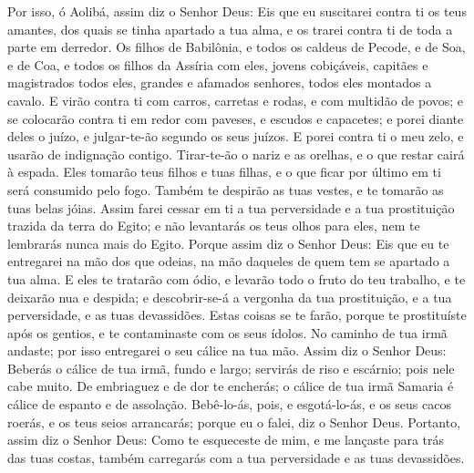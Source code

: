 Por isso, ó Aolibá, assim diz o Senhor Deus: Eis que eu
suscitarei contra ti os teus amantes, dos quais se tinha apartado a
tua alma, e os trarei contra ti de toda a parte em derredor.
Os filhos de Babilônia, e todos os caldeus de Pecode, e de
Soa, e de Coa, e todos os filhos da Assíria com eles, jovens
cobiçáveis, capitães e magistrados todos eles, grandes e afamados
senhores, todos eles montados a cavalo. E virão contra ti com
carros, carretas e rodas, e com multidão de povos; e se colocarão
contra ti em redor com paveses, e escudos e capacetes; e porei
diante deles o juízo, e julgar-te-ão segundo os seus juízos.
E porei contra ti o meu zelo, e usarão de indignação contigo.
Tirar-te-ão o nariz e as orelhas, e o que restar cairá à espada.
Eles tomarão teus filhos e tuas filhas, e o que ficar por último em
ti será consumido pelo fogo. Também te despirão as tuas
vestes, e te tomarão as tuas belas jóias. Assim farei cessar
em ti a tua perversidade e a tua prostituição trazida da terra do
Egito; e não levantarás os teus olhos para eles, nem te lembrarás
nunca mais do Egito. Porque assim diz o Senhor Deus: Eis que
eu te entregarei na mão dos que odeias, na mão daqueles de quem tem
se apartado a tua alma. E eles te tratarão com ódio, e
levarão todo o fruto do teu trabalho, e te deixarão nua e despida; e
descobrir-se-á a vergonha da tua prostituição, e a tua perversidade,
e as tuas devassidões. Estas coisas se te farão, porque te
prostituíste após os gentios, e te contaminaste com os seus ídolos.
No caminho de tua irmã andaste; por isso entregarei o seu
cálice na tua mão. Assim diz o Senhor Deus: Beberás o cálice
de tua irmã, fundo e largo; servirás de riso e escárnio; pois nele
cabe muito. De embriaguez e de dor te encherás; o cálice de
tua irmã Samaria é cálice de espanto e de assolação.
Bebê-lo-ás, pois, e esgotá-lo-ás, e os seus cacos roerás, e
os teus seios arrancarás; porque eu o falei, diz o Senhor Deus.
Portanto, assim diz o Senhor Deus: Como te esqueceste de mim,
e me lançaste para trás das tuas costas, também carregarás com a tua
perversidade e as tuas devassidões.

